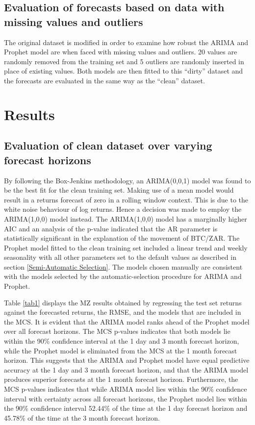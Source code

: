 \documentclass[12pt,a4paper]{article}
\numberwithin{equation}{section}
\numberwithin{figure}{section}
\numberwithin{table}{section}
\begin{document}
\subsection{Evaluation of forecasts based on data with missing values
and
outliers}\label{evaluation-of-forecasts-based-on-data-with-missing-values-and-outliers}

The original dataset is modified in order to examine how robust the
ARIMA and Prophet model are when faced with missing values and outliers.
20 values are randomly removed from the training set and 5 outliers are
randomly inserted in place of existing values. Both models are then
fitted to this ``dirty'' dataset and the forecasts are evaluated in the
same way as the ``clean'' dataset.

\section{\texorpdfstring{Results
\label{Results}}{Results }}\label{results}

\subsection{Evaluation of clean dataset over varying forecast
horizons}\label{evaluation-of-clean-dataset-over-varying-forecast-horizons}

By following the Box-Jenkins methodology, an ARIMA(0,0,1) model was
found to be the best fit for the clean training set. Making use of a
mean model would result in a returns forecast of zero in a rolling
window context. This is due to the white noise behaviour of log returns.
Hence a decision was made to employ the ARIMA(1,0,0) model instead. The
ARIMA(1,0,0) model has a marginally higher AIC and an analysis of the
p-value indicated that the AR parameter is statistically significant in
the explanation of the movement of BTC/ZAR. The Prophet model fitted to
the clean training set included a linear trend and weekly seasonality
with all other parameters set to the default values as described in
section \ref{Semi-Automatic Selection}. The models chosen manually are
consistent with the models selected by the automatic-selection procedure
for ARIMA and Prophet.

Table \ref{tab1} displays the MZ results obtained by regressing the test
set returns against the forecasted returns, the RMSE, and the models
that are included in the MCS. It is evident that the ARIMA model ranks
ahead of the Prophet model over all forecast horizons. The MCS p-values
indicates that both models lie within the 90\% confidence interval at
the 1 day and 3 month forecast horizon, while the Prophet model is
eliminated from the MCS at the 1 month forecast horizon. This suggests
that the ARIMA and Prophet model have equal predictive accuracy at the 1
day and 3 month forecast horizon, and that the ARIMA model produces
superior forecasts at the 1 month forecast horizon. Furthermore, the MCS
p-values indicates that while ARIMA model lies within the 90\%
confidence interval with certainty across all forecast horizons, the
Prophet model lies within the 90\% confidence interval 52.44\% of the
time at the 1 day forecast horizon and 45.78\% of the time at the 3
month forecast horizon.
\end{document}
